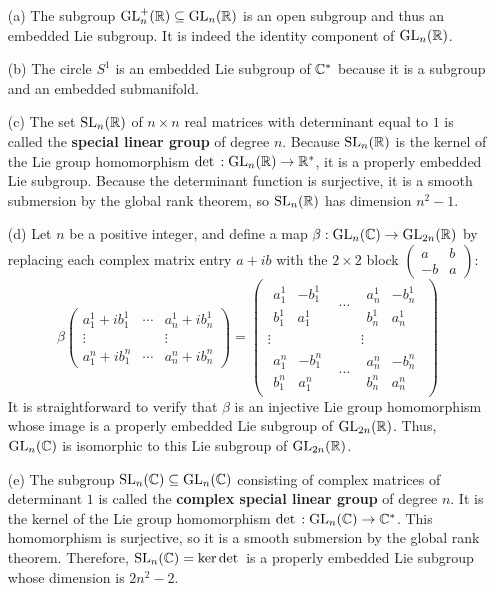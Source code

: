 \begin{example}\label{Lie subgroups eg}
\mbox{}
\begin{itemize}
\item[(a)] The subgroup $\mathrm{GL}^+_n(\mathbb{R})\subseteq\mathrm{GL}_n(\mathbb{R})$ is an open subgroup and thus an embedded Lie subgroup. It is indeed the identity component of $\mathrm{GL}_n(\mathbb{R})$.
\item[(b)] The circle $S^1$ is an embedded Lie subgroup of $\mathbb{C}^*$ because it is a subgroup and an embedded submanifold.
\item[(c)] The set $\mathrm{SL}_n(\mathbb{R})$ of $n\times n$ real matrices with determinant equal to $1$ is called the \textbf{special linear group} of degree $n$. Because $\mathrm{SL}_n(\mathbb{R})$ is the kernel of the Lie group homomorphism $\mathrm{det}\,:\mathrm{GL}_n(\mathbb{R})\to\mathbb{R}^*$, it is a properly embedded Lie subgroup. Because the determinant function is surjective, it is a smooth submersion by the global rank theorem, so $\mathrm{SL}_n(\mathbb{R})$ has dimension $n^2-1$.
\item[(d)] Let $n$ be a positive integer, and define a map $\beta:\mathrm{GL}_n(\mathbb{C})\to\mathrm{GL}_{2n}(\mathbb{R})$ by replacing each complex matrix entry $a+ib$ with the $2\times 2$ block $(\begin{smallmatrix}
a&b\\
-b&a
\end{smallmatrix})$:
\[\beta\begin{pmatrix}
a^1_1+ib^1_1&\cdots&a^1_n+ib^1_n\\
\vdots&&\vdots\\
a^n_1+ib^n_1&\cdots&a^n_n+ib^n_n
\end{pmatrix}
=\begin{pmatrix}
\begin{array}{cc}
a^1_1&-b^1_1\\
b^1_1&a^1_1
\end{array}&\cdots&\begin{array}{cc}
a^1_n&-b^1_n\\
b^1_n&a^1_n
\end{array}\\
\vdots&&\vdots\\
\begin{array}{cc}
a^n_1&-b^n_1\\
b^n_1&a^n_1
\end{array}&\cdots&\begin{array}{cc}
a^n_n&-b^n_n\\
b^n_n&a^n_n
\end{array}
\end{pmatrix}
\]
It is straightforward to verify that $\beta$ is an injective Lie group homomorphism whose image is a properly embedded Lie subgroup of $\mathrm{GL}_{2n}(\mathbb{R})$. Thus, $\mathrm{GL}_n(\mathbb{C})$ is isomorphic to this Lie subgroup of $\mathrm{GL}_{2n}(\mathbb{R})$.
\item[(e)] The subgroup $\mathrm{SL}_n(\mathbb{C})\subseteq\mathrm{GL}_n(\mathbb{C})$ consisting of complex matrices of determinant $1$ is called the \textbf{complex special linear group} of degree $n$. It is the kernel of the Lie group homomorphism $\mathrm{det}\,:\mathrm{GL}_n(\mathbb{C})\to\mathbb{C}^*$. This homomorphism is surjective, so it is a smooth submersion by the global rank theorem. Therefore, $\mathrm{SL}_n(\mathbb{C})=\ker\mathrm{det}\,$ is a properly embedded Lie subgroup whose dimension is $2n^2-2$.
\end{itemize}
\end{example}
